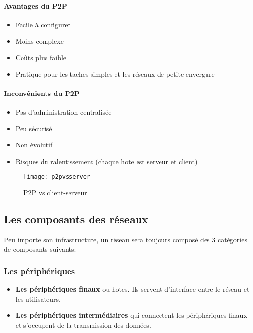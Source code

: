  \paragraph{Avantages du P2P}

 \smallskip

 \begin{itemize}
	 \item Facile à configurer
	 \item Moins complexe
	 \item Coûts plus faible
	 \item Pratique pour les taches simples et les réseaux de petite envergure
 \end{itemize}

 \paragraph{Inconvénients du P2P}

 \smallskip

 \begin{itemize}
	 \item Pas d'administration centralisée
	 \item Peu sécurisé
	 \item Non évolutif
	 \item Risques du ralentissement (chaque hote est serveur et client)
 \end{itemize}

 \begin{figure}[h]
	 \centering
	 \texttt{[image: p2pvsserver]}
	 \caption{P2P vs client-serveur}
 \end{figure}

 \subsection{Les composants des réseaux}
 Peu importe son infrastructure, un réseau sera toujours composé des 3 catégories de composants suivants:
 \subsubsection{Les périphériques}
 \begin{itemize}
	 \item \textbf{Les périphériques finaux} ou hotes. Ils servent d'interface entre le réseau et les utilisateurs.
	 \item \textbf{Les périphériques intermédiaires} qui connectent les périphériques finaux et s'occupent de la transmission des données.
 \end{itemize}

